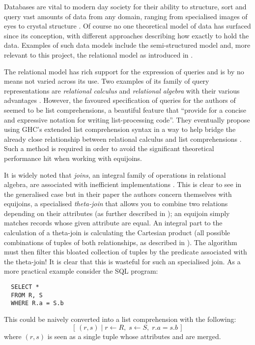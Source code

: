 Databases are vital to modern day society for their ability to structure, sort and query vast amounts of data from any domain, ranging from specialised images of eyes  to crystal structure \cite{CambridgeStructuralDatabase}. Of course no one theoretical model of data has surfaced since its conception, with different approaches describing how exactly to hold the data. Examples of such data models include the semi-structured model \cite{DatabaseSystems} and, more relevant to this project, the relational model \cite{RelationalModel} as introduced in .

The relational model has rich support for the expression of queries and is by no means not varied across its use. Two examples of its family of query representations are \emph{relational calculus} and \emph{relational algebra} with their various advantages \cite{RelationalCalculus,RelationalModel}.  However, the favoured specification of queries for the authors of \cite{RelationalAlgebraByWayOfAdjunctions} seemed to be list comprehensions, a beautiful feature that ``provide for a concise and expressive notation for writing list-processing code''. \cite{MonadComprehensions} They eventually propose using GHC's extended list comprehension syntax in a way to help bridge the already close relationship between relational calculus and list comprehensions \cite{GHCListComprehension,ComprehensiveComprehensions}. Such a method is required in order to avoid the significant theoretical performance hit when working with equijoins.

It is widely noted that \emph{joins}, an integral family of operations in relational algebra, are associated with inefficient implementations \cite{JoinProcessing}. This is clear to see in the generalised case but in their paper \cite{RelationalAlgebraByWayOfAdjunctions} the authors concern themselves with equijoins, a specialised \emph{theta-join} that allows you to combine two relations depending on their attributes (as further described in ); an equijoin simply matches records whose given attribute are equal. An integral part to the calculation of a theta-join is calculating the Cartesian product (all possible combinations of tuples of both relationships, as described in ). The algorithm must then filter this bloated collection of tuples by the predicate associated with the theta-join! It is clear that this is wasteful for such an specialised join. As a more practical example consider the SQL program:
\begin{lstlisting}
  SELECT *
  FROM R, S
  WHERE R.a = S.b
\end{lstlisting}
This could be naively converted into a list comprehension with the following:
\[
  \left[\,(r, s)\;|\;r \leftarrow R,\;s \leftarrow S,\;r.a = s.b\,\right]
\]
where $(r, s)$ is seen as a single tuple whose attributes
 and  are merged. 

